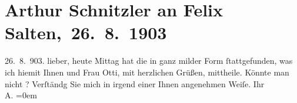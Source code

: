 

         
         \renewcommand{\erwaehntePersonen}{Personen: Felix Salten, Ottilie Salten}
         \renewcommand{\erwaehnteOrte}{Orte: Wien}
         \renewcommand{\erwaehnteWerke}{}
               \section[ Arthur Schnitzler an Felix Salten, 26. 8. 1903]{ Arthur Schnitzler an Felix Salten, 26. 8. 1903}\nopagebreak{}\rehead{ }\begin{ledgroupsized}[t]{13cm}\normalsize\beginnumbering \toendnotes[C]{\smallbreak\pagebreak[2]} 
\toendnotes[C]{\smallbreak}\pstart
           \raggedleft{}{\pb}26. 8. 903.\pend
           \pstart
           lieber,{ }heute{ }Mittag hat die \label{K_L02983-1v}\label{K_L02983-1h} in ganz milder Form ſtattgefunden, was ich hiemit Ihnen und Frau Otti, mit herzlichen Grüßen, mittheile.\pend
           \pstart
           {\pb}Könnte man nicht \label{K_L02983-2v}\label{K_L02983-2h}?
                  Verſtändg Sie mich in irgend einer Ihnen angenehmen
               Weiſe.\pend
           \pstart
           Ihr {\\[\baselineskip]}\spacefill\mbox{A.}\pend
           \leftskip=0em{}
         
         \endnumbering{}\end{ledgroupsized}  \newcommand{\dateiname}{L02983}\newcommand{\titel}{Arthur Schnitzler an Felix Salten, 26. 8. 1903}\newcommand{\editorInnen}{Martin Anton Müller und Laura Untner}
      